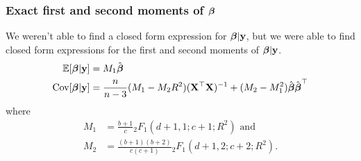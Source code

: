 \documentclass{beamer}
\begin{document}
\begin{frame}
	\frametitle{Exact first and second moments of ${\boldsymbol \beta}$}
	We weren't able to find a closed form expression for ${\boldsymbol \beta} | {\bf y}$, but we were able to find closed form
	expressions for the first and second moments of ${\boldsymbol \beta} | {\bf y}$.
	\small
	\begin{align*}
		\mathbb{E}[{\boldsymbol \beta} | {\bf y}] &= M_1 \hat{{\boldsymbol \beta}} \\
		\mbox{Cov}[{\boldsymbol \beta} | {\bf y}] &= \frac{n}{n - 3} (M_1 - M_2 R^2)({\bf X}^\top {\bf X})^{-1} + (M_2 - M_1^2) \hat{{\boldsymbol \beta}} \hat{{\boldsymbol \beta}}^\top
	\end{align*}
	where
	\small
	\begin{align*}
		M_1 &= \frac{b + 1}{c} {}_2 F_1 (d + 1, 1; c + 1; R^2) \text{ and } \\
		M_2 &= \frac{(b + 1)(b + 2)}{c(c + 1)} {}_2 F_1 (d + 1, 2; c + 2; R^2).
	\end{align*}
\end{frame}

\end{document}
